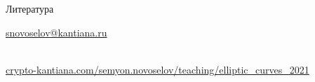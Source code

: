 \documentclass{beamer}
\begin{document}
\begin{frame}{Литература}
    \nocite{Washington2008}
    \nocite{Lang1978}
    \nocite{vanTuyl1997}
    \nocite{GathenJurgen2013}
    \nocite{CohenFrey+2005}
    \printbibliography
    
\begin{center}
    \begin{tcolorbox}[enhanced,hbox,colback=block-green-color-bg,colframe=subsection-color!120,title=Контакты,center title]
        \begin{varwidth}{\textwidth}
            \begin{center}
                \href{mailto:snovoselov@kantiana.ru}{snovoselov@kantiana.ru}
            \end{center}
        \end{varwidth}
    \end{tcolorbox}	
\end{center}

\\
{\footnotesize
    \href{https://crypto-kantiana.com/semyon.novoselov/teaching/elliptic_curves_2021}{crypto-kantiana.com/semyon.novoselov/teaching/elliptic\_curves\_2021}
}
\end{frame}
\end{document}
